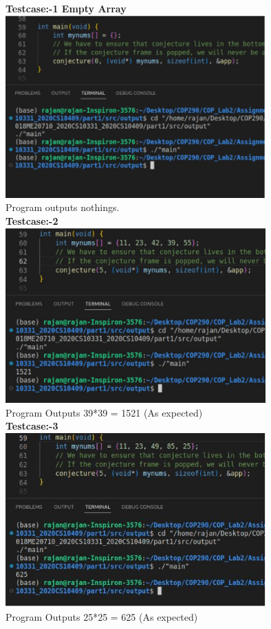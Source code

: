 \documentclass[12pt]{article}
\begin{document}
\begin{spacing}{1.2}
    \newpage
    
\textbf{Testcase:-1 Empty Array}\\
\includegraphics[width=10cm]{images/2.jpg}\\
{Program outputs nothings.}\\



\textbf{Testcase:-2}\\
\includegraphics[width=10cm]{images/3.jpg}\\
Program Outputs 39*39 = 1521 (As expected)\\


\textbf{Testcase:-3}\\
\includegraphics[width=10cm]{images/4.jpg}\\
Program Outputs 25*25 = 625 (As expected)\\


\end{spacing}
\end{document}
